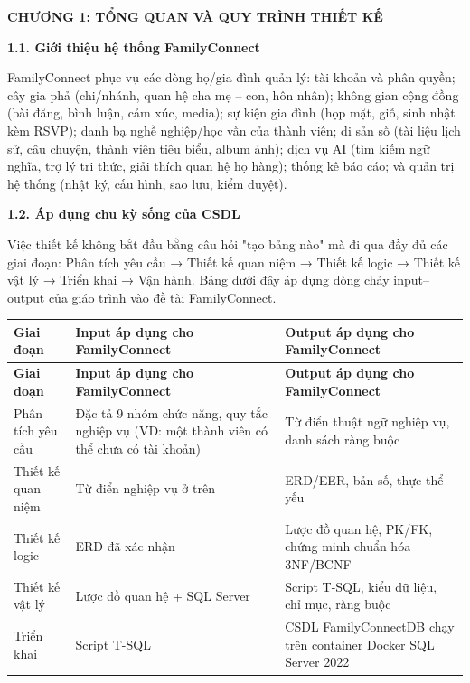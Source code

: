 
\clearpage
{}
{}
{\LARGE\bfseries CHƯƠNG 1: TỔNG QUAN VÀ QUY TRÌNH THIẾT KẾ}\par\vspace{1em}

{}
{\Large\bfseries 1.1. Giới thiệu hệ thống FamilyConnect}\par\vspace{0.7em}

FamilyConnect phục vụ các dòng họ/gia đình quản lý: tài khoản và phân quyền; cây gia phả (chi/nhánh, quan hệ cha mẹ – con, hôn nhân); không gian cộng đồng (bài đăng, bình luận, cảm xúc, media); sự kiện gia đình (họp mặt, giỗ, sinh nhật kèm RSVP); danh bạ nghề nghiệp/học vấn của thành viên; di sản số (tài liệu lịch sử, câu chuyện, thành viên tiêu biểu, album ảnh); dịch vụ AI (tìm kiếm ngữ nghĩa, trợ lý tri thức, giải thích quan hệ họ hàng); thống kê báo cáo; và quản trị hệ thống (nhật ký, cấu hình, sao lưu, kiểm duyệt).

{}
{\Large\bfseries 1.2. Áp dụng chu kỳ sống của CSDL}\par\vspace{0.7em}

Việc thiết kế không bắt đầu bằng câu hỏi "tạo bảng nào" mà đi qua đầy đủ các giai đoạn: Phân tích yêu cầu → Thiết kế quan niệm → Thiết kế logic → Thiết kế vật lý → Triển khai → Vận hành. Bảng dưới đây áp dụng dòng chảy input–output của giáo trình vào đề tài FamilyConnect.

\begin{longtable}{|p{}|p{}|p{}|}
\hline
\textbf{Giai đoạn} & \textbf{Input áp dụng cho FamilyConnect} & \textbf{Output áp dụng cho FamilyConnect} \\ \hline
\endfirsthead
\hline
\textbf{Giai đoạn} & \textbf{Input áp dụng cho FamilyConnect} & \textbf{Output áp dụng cho FamilyConnect} \\ \hline
\endhead
Phân tích yêu cầu & Đặc tả 9 nhóm chức năng, quy tắc nghiệp vụ (VD: một thành viên có thể chưa có tài khoản) & Từ điển thuật ngữ nghiệp vụ, danh sách ràng buộc \\ \hline
Thiết kế quan niệm & Từ điển nghiệp vụ ở trên & ERD/EER, bản số, thực thể yếu \\ \hline
Thiết kế logic & ERD đã xác nhận & Lược đồ quan hệ, PK/FK, chứng minh chuẩn hóa 3NF/BCNF \\ \hline
Thiết kế vật lý & Lược đồ quan hệ + SQL Server & Script T-SQL, kiểu dữ liệu, chỉ mục, ràng buộc  \\ \hline
Triển khai & Script T-SQL & CSDL FamilyConnectDB chạy trên container Docker SQL Server 2022 \\ \hline
\end{longtable}


